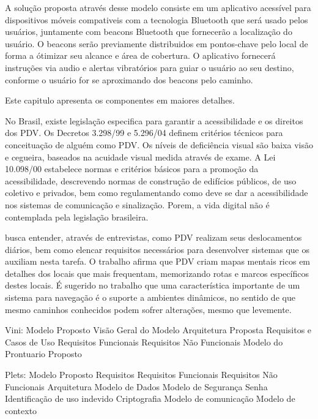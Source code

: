 \documentclass[english,brazilian]{UNISINOSmonografia}
\begin{document}
A solução proposta através desse modelo consiste em um aplicativo acessível para dispositivos móveis compativeis com a tecnologia Bluetooth que será usado pelos usuários, juntamente com beacons Bluetooth que fornecerão a localização do usuário. O beacons serão previamente distribuidos em pontos-chave pelo local de forma a ótimizar seu alcance e área de cobertura. O aplicativo fornecerá instruções via audio e alertas vibratórios para guiar o usuário ao seu destino, conforme o usuário for se aproximando dos beacons pelo caminho.

Este capitulo apresenta os componentes em maiores detalhes.







No Brasil, existe legislação especifica para garantir a acessibilidade e os direitos dos PDV. Os Decretos 3.298/99 e 5.296/04 definem critérios técnicos para conceituação de alguém como PDV. Os níveis de deficiência visual são baixa visão e cegueira, baseados na acuidade visual medida através de exame. A Lei 10.098/00 estabelece normas e critérios básicos para a promoção da acessibilidade, descrevendo normas de construção de edifícios públicos, de uso coletivo e privados, bem como regulamentando como deve se dar a acessibilidade nos sistemas de comunicação e sinalização. Porem, a vida digital não é contemplada pela legislação brasileira.


 busca entender, através de entrevistas, como PDV realizam seus deslocamentos diários, bem como elencar requisitos necessários para desenvolver sistemas que os auxiliam nesta tarefa. O trabalho afirma que PDV criam mapas mentais ricos em detalhes dos locais que mais frequentam, memorizando rotas e marcos específicos destes locais. É sugerido no trabalho que uma característica importante de um sistema para navegação é o suporte a ambientes dinâmicos, no sentido de que mesmo caminhos conhecidos podem sofrer alterações, mesmo que levemente.




Vini:
Modelo Proposto
	Visão Geral do Modelo
	Arquitetura Proposta
	Requisitos e Casos de Uso
		Requisitos Funcionais
		Requisitos Não Funcionais
	Modelo do Prontuario Proposto


Plets:
Modelo Proposto
	Requisitos
		Requisitos Funcionais
		Requisitos Não Funcionais
	Arquitetura
	Modelo de Dados
	Modelo de Segurança
		Senha
		Identificação de uso indevido
		Criptografia
	Modelo de comunicação
	Modelo de contexto
\end{document}
